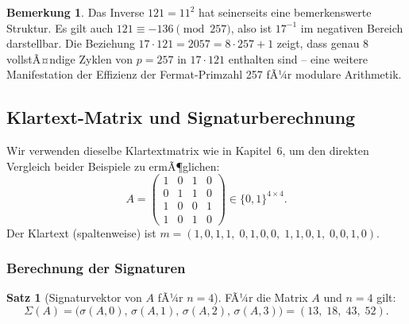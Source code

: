 ﻿\documentclass[a4paper,12pt]{scrreprt}
\theoremstyle{definition}
\newtheorem{bemerkung}{Bemerkung}[section]
\newtheorem{satz}{Satz}[section]
\begin{document}
\begin{bemerkung}
Das Inverse $121 = 11^2$ hat seinerseits eine bemerkenswerte Struktur. Es gilt auch $121 \equiv -136 \pmod{257}$, also ist $17^{-1}$ im negativen Bereich darstellbar. Die Beziehung $17 \cdot 121 = 2057 = 8 \cdot 257 + 1$ zeigt, dass genau 8 vollstÃ¤ndige Zyklen von $p=257$ in $17 \cdot 121$ enthalten sind -- eine weitere Manifestation der Effizienz der Fermat-Primzahl 257 fÃ¼r modulare Arithmetik.
\end{bemerkung}

\subsection{Klartext-Matrix und Signaturberechnung}

Wir verwenden dieselbe Klartextmatrix wie in Kapitel~6, um den direkten Vergleich beider Beispiele zu ermÃ¶glichen:
\[
A = \begin{pmatrix} 1 & 0 & 1 & 0 \\ 0 & 1 & 1 & 0 \\ 1 & 0 & 0 & 1 \\ 1 & 0 & 1 & 0 \end{pmatrix} \in \{0,1\}^{4 \times 4}.
\]
Der Klartext (spaltenweise) ist $m = (1,0,1,1,\;0,1,0,0,\;1,1,0,1,\;0,0,1,0)$.

\subsubsection{Berechnung der Signaturen}

\begin{satz}[Signaturvektor von $A$ fÃ¼r $n=4$]
\label{satz:sigvek2}
FÃ¼r die Matrix $A$ und $n=4$ gilt:
\[
\Sigma(A) = \bigl(\sigma(A,0),\, \sigma(A,1),\, \sigma(A,2),\, \sigma(A,3)\bigr) = (13,\; 18,\; 43,\; 52).
\]
\end{satz}
\end{document}
